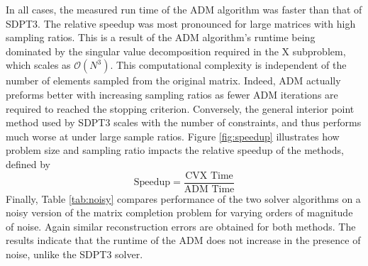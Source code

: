 \documentclass{article}
\begin{document}
In all cases, the measured run time of the ADM algorithm was faster than that of SDPT3.  The relative speedup was most pronounced for large matrices with high sampling ratios.  This is a result of the ADM algorithm's runtime being dominated by the singular value decomposition required in the X subproblem, which scales as $\mathcal{O}(N^3)$.  This computational complexity is independent of the number of elements sampled from the original matrix.  Indeed, ADM actually preforms better with increasing sampling ratios as fewer ADM iterations are required to reached the stopping criterion.  Conversely, the general interior point method used by SDPT3 scales with the number of constraints, and thus performs much worse at under large sample ratios.  Figure \ref{fig:speedup} illustrates how problem size and sampling ratio impacts the relative speedup of the methods, defined by
$$
\textrm{Speedup} = \frac {\textrm{CVX Time}} {\textrm{ADM Time}}
$$ 
Finally, Table \ref{tab:noisy} compares performance of the two solver algorithms on a noisy version of the matrix completion problem for varying orders of magnitude of noise.  Again similar reconstruction errors are obtained for both methods.   The results indicate that the runtime of the ADM does not increase in the presence of noise, unlike the SDPT3 solver.   
\end{document}
